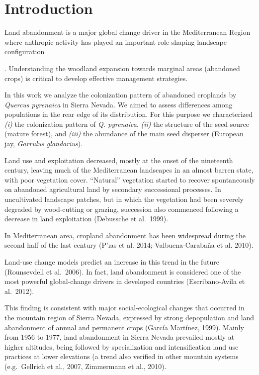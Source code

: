 \documentclass[
]{article}
\begin{document}
\hypertarget{introduction}{%
\section{Introduction}\label{introduction}}

Land abandonment is a major global change driver in the Mediterranean
Region where anthropic activity has played an important role shaping
landscape configuration

. Understanding the woodland expansion towards marginal areas (abandoned
crops) is critical to develop effective management strategies.

In this work we analyze the colonization pattern of abandoned croplands
by \emph{Quercus pyrenaica} in Sierra Nevada. We aimed to assess
differences among populations in the rear edge of its distribution. For
this purpose we characterized \emph{(i)} the colonization pattern of
\emph{Q. pyrenaica}, \emph{(ii)} the structure of the seed source
(mature forest), and \emph{(iii)} the abundance of the main seed
disperser (European jay, \emph{Garrulus glandarius}).

Land use and exploitation decreased, mostly at the onset of the
nineteenth century, leaving much of the Mediterranean landscapes in an
almost barren state, with poor vegetation cover. ``Natural'' vegetation
started to recover spontaneously on abandoned agricultural land by
secondary successional processes. In uncultivated landscape patches, but
in which the vegetation had been severely degraded by wood-cutting or
grazing, succession also commenced following a decrease in land
exploitation (Debussche et al.~1999).

In Mediterranean area, cropland abandonment has been widespread during
the second half of the last century (P'ıas et al. 2014;
Valbuena-Carabaña et al. 2010).

Land-use change models predict an increase in this trend in the future
(Rounsevdell et al.~2006). In fact, land abandonment is considered one
of the most powerful global-change drivers in developed countries
(Escribano-Avila et al.~2012).

This finding is consistent with major social-ecological changes that
occurred in the mountain region of Sierra Nevada, expressed by strong
depopulation and land abandonment of annual and permanent crops (García
Martínez, 1999). Mainly from 1956 to 1977, land abandonment in Sierra
Nevada prevailed mostly at higher altitudes, being followed by
specialization and intensification land use practices at lower
elevations (a trend also verified in other mountain systems
(e.g.~Gellrich et al., 2007, Zimmermann et al., 2010).
\end{document}
